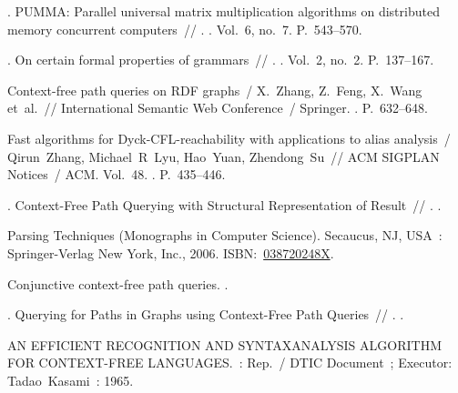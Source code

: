 \begin{thebibliography}{10}
. PUMMA: Parallel
  universal matrix multiplication algorithms on distributed memory concurrent
  computers~// .
  \BibDash
{}. \BibDash
\newblock Vol.~6, no.~7. \BibDash
\newblock P.~543--570.

. On certain formal properties of grammars~//
  . \BibDash
{}. \BibDash
\newblock Vol.~2, no.~2. \BibDash
\newblock P.~137--167.

Context-free path queries on RDF graphs~/ X.~Zhang, Z.~Feng, X.~Wang et~al.~//
  International Semantic Web Conference~/ Springer. \BibDash
{}. \BibDash
\newblock P.~632--648.

Fast algorithms for Dyck-CFL-reachability with applications to alias analysis~/
  Qirun~Zhang, Michael~R~Lyu, Hao~Yuan, Zhendong~Su~// ACM SIGPLAN Notices~/
  ACM. \BibDash
\newblock Vol.~48. \BibDash
{}. \BibDash
\newblock P.~435--446.

. Context-Free Path Querying with
  Structural Representation of Result~// . \BibDash
{}.

 Parsing Techniques (Monographs in
  Computer Science). \BibDash
\newblock Secaucus, NJ, USA~: Springer-Verlag New York, Inc., 2006. \BibDash
\newblock
  ISBN:~\href{http://isbndb.com/search-all.html?kw=038720248X}{038720248X}.

 Conjunctive context-free path queries. \BibDash
{}.

. Querying for Paths in Graphs using Context-Free Path
  Queries~// . \BibDash
{}.

AN EFFICIENT RECOGNITION AND SYNTAXANALYSIS ALGORITHM FOR CONTEXT-FREE
  LANGUAGES.~: Rep.~/ DTIC Document~; Executor: Tadao~Kasami~: 1965.


\end{thebibliography}
